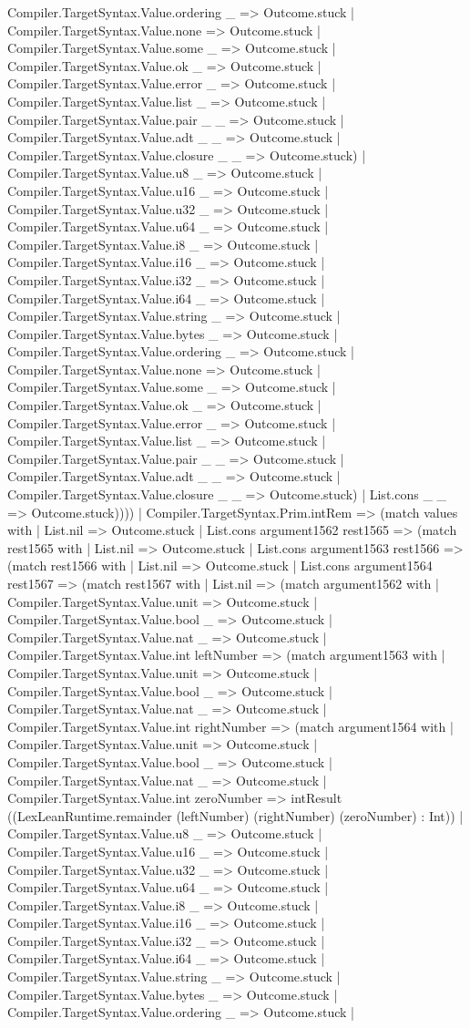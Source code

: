 \documentclass[11pt]{article}
\begin{document}
Compiler.TargetSyntax.Value.ordering \_ => Outcome.stuck | Compiler.TargetSyntax.Value.none => Outcome.stuck | Compiler.TargetSyntax.Value.some \_ => Outcome.stuck | Compiler.TargetSyntax.Value.ok \_ => Outcome.stuck | Compiler.TargetSyntax.Value.error \_ => Outcome.stuck | Compiler.TargetSyntax.Value.list \_ => Outcome.stuck | Compiler.TargetSyntax.Value.pair \_ \_ => Outcome.stuck | Compiler.TargetSyntax.Value.adt \_ \_ => Outcome.stuck | Compiler.TargetSyntax.Value.closure \_ \_ => Outcome.stuck) | Compiler.TargetSyntax.Value.u8 \_ => Outcome.stuck | Compiler.TargetSyntax.Value.u16 \_ => Outcome.stuck | Compiler.TargetSyntax.Value.u32 \_ => Outcome.stuck | Compiler.TargetSyntax.Value.u64 \_ => Outcome.stuck | Compiler.TargetSyntax.Value.i8 \_ => Outcome.stuck | Compiler.TargetSyntax.Value.i16 \_ => Outcome.stuck | Compiler.TargetSyntax.Value.i32 \_ => Outcome.stuck | Compiler.TargetSyntax.Value.i64 \_ => Outcome.stuck | Compiler.TargetSyntax.Value.string \_ => Outcome.stuck | Compiler.TargetSyntax.Value.bytes \_ => Outcome.stuck | Compiler.TargetSyntax.Value.ordering \_ => Outcome.stuck | Compiler.TargetSyntax.Value.none => Outcome.stuck | Compiler.TargetSyntax.Value.some \_ => Outcome.stuck | Compiler.TargetSyntax.Value.ok \_ => Outcome.stuck | Compiler.TargetSyntax.Value.error \_ => Outcome.stuck | Compiler.TargetSyntax.Value.list \_ => Outcome.stuck | Compiler.TargetSyntax.Value.pair \_ \_ => Outcome.stuck | Compiler.TargetSyntax.Value.adt \_ \_ => Outcome.stuck | Compiler.TargetSyntax.Value.closure \_ \_ => Outcome.stuck) | List.cons \_ \_ => Outcome.stuck)))) | Compiler.TargetSyntax.Prim.intRem => (match values with | List.nil => Outcome.stuck | List.cons argument1562 rest1565 => (match rest1565 with | List.nil => Outcome.stuck | List.cons argument1563 rest1566 => (match rest1566 with | List.nil => Outcome.stuck | List.cons argument1564 rest1567 => (match rest1567 with | List.nil => (match argument1562 with | Compiler.TargetSyntax.Value.unit => Outcome.stuck | Compiler.TargetSyntax.Value.bool \_ => Outcome.stuck | Compiler.TargetSyntax.Value.nat \_ => Outcome.stuck | Compiler.TargetSyntax.Value.int leftNumber => (match argument1563 with | Compiler.TargetSyntax.Value.unit => Outcome.stuck | Compiler.TargetSyntax.Value.bool \_ => Outcome.stuck | Compiler.TargetSyntax.Value.nat \_ => Outcome.stuck | Compiler.TargetSyntax.Value.int rightNumber => (match argument1564 with | Compiler.TargetSyntax.Value.unit => Outcome.stuck | Compiler.TargetSyntax.Value.bool \_ => Outcome.stuck | Compiler.TargetSyntax.Value.nat \_ => Outcome.stuck | Compiler.TargetSyntax.Value.int zeroNumber => intResult ((LexLeanRuntime.remainder (leftNumber) (rightNumber) (zeroNumber) : Int)) | Compiler.TargetSyntax.Value.u8 \_ => Outcome.stuck | Compiler.TargetSyntax.Value.u16 \_ => Outcome.stuck | Compiler.TargetSyntax.Value.u32 \_ => Outcome.stuck | Compiler.TargetSyntax.Value.u64 \_ => Outcome.stuck | Compiler.TargetSyntax.Value.i8 \_ => Outcome.stuck | Compiler.TargetSyntax.Value.i16 \_ => Outcome.stuck | Compiler.TargetSyntax.Value.i32 \_ => Outcome.stuck | Compiler.TargetSyntax.Value.i64 \_ => Outcome.stuck | Compiler.TargetSyntax.Value.string \_ => Outcome.stuck | Compiler.TargetSyntax.Value.bytes \_ => Outcome.stuck | Compiler.TargetSyntax.Value.ordering \_ => Outcome.stuck | 
\end{document}
